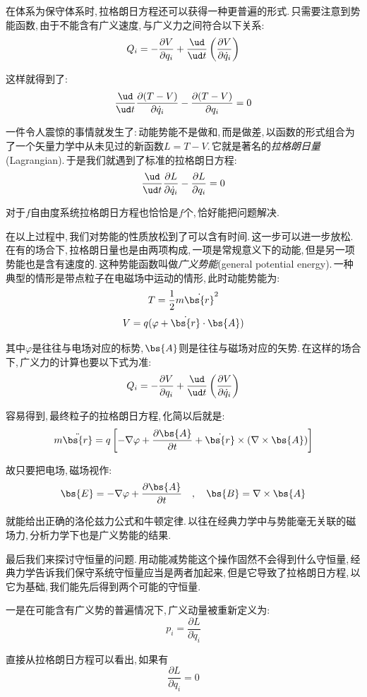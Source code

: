 \vspace{1cm}
在体系为保守体系时,\,拉格朗日方程还可以获得一种更普遍的形式.\,只需要注意到势能函数,\,由于不能含有广义速度,\,与广义力之间符合以下关系:
\[Q_i=-\frac{\partial V}{\partial q_i}+\frac{\ud }{\ud t}\left(\frac{\partial V}{\partial \dot{q}_i}\right)\]

这样就得到了:
\[\frac{\ud }{\ud t}\frac{\partial (T-V)}{\partial \dot{q}_i}-\frac{\partial (T-V)}{\partial q_i}=0\]

一件令人震惊的事情就发生了:\,动能势能不是做和,\,而是做差,\,以函数的形式组合为了一个矢量力学中从未见过的新函数$L=T-V$.\,它就是著名的\emph{拉格朗日量}(Lagrangian).\,于是我们就遇到了标准的拉格朗日方程:
\[\frac{\ud }{\ud t}\frac{\partial L}{\partial \dot{q}_i}-\frac{\partial L}{\partial q_i}=0\]

对于$f$自由度系统拉格朗日方程也恰恰是$f$个,\,恰好能把问题解决.

在以上过程中,\,我们对势能的性质放松到了可以含有时间.\,这一步可以进一步放松.\,在有的场合下,\,拉格朗日量也是由两项构成,\,一项是常规意义下的动能,\,但是另一项势能也是含有速度的.\,这种势能函数叫做\emph{广义势能}(general potential energy).\,一种典型的情形是带点粒子在电磁场中运动的情形,\,此时动能势能为:
\[T=\frac{1}{2}m\dot{\bs{r}}^2\]
\[V=q(\varphi+\dot{\bs{r}}\cdot \bs{A})\]

其中$\varphi$是往往与电场对应的标势,\,$\bs{A}$则是往往与磁场对应的矢势.\,在这样的场合下,\,广义力的计算也要以下式为准:
\[Q_i=-\frac{\partial V}{\partial q_i}+\frac{\ud }{\ud t}\left(\frac{\partial V}{\partial \dot{q}_i}\right)\]

容易得到,\,最终粒子的拉格朗日方程,\,化简以后就是:
\[m\ddot{\bs{r}}=q\left[-\nabla\varphi+\frac{\partial \bs{A}}{\partial t}+\dot{\bs{r}}\times(\nabla\times\bs{A})\right]\]

故只要把电场,\,磁场视作:
\[\bs{E}=-\nabla\varphi+\frac{\partial \bs{A}}{\partial t}\quad,\quad \bs{B}=\nabla\times\bs{A}\]

就能给出正确的洛伦兹力公式和牛顿定律.\,以往在经典力学中与势能毫无关联的磁场力,\,分析力学下也是广义势能的结果.

\vspace{1cm}
最后我们来探讨守恒量的问题.\,用动能减势能这个操作固然不会得到什么守恒量,\,经典力学告诉我们保守系统守恒量应当是两者加起来,\,但是它导致了拉格朗日方程,\,以它为基础,\,我们能先后得到两个可能的守恒量.

一是在可能含有广义势的普遍情况下,\,广义动量被重新定义为:
\[p_i=\frac{\partial L}{\partial \dot{q}_i}\]

直接从拉格朗日方程可以看出,\,如果有
\[\frac{\partial L}{\partial {q}_i}=0\]

